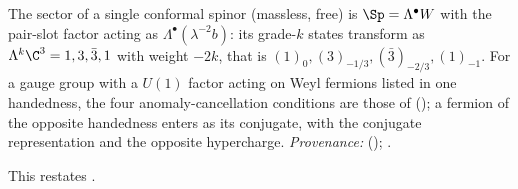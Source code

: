 The sector of a single conformal spinor (massless, free) is $\Sp = \Lambda^{\bullet}W$ with the pair-slot factor acting as $\Lambda^{\bullet}(\lambda^{-2}b)$: its grade-$k$ states transform as $\Lambda^{k}\C^{3} = 1, 3, \bar{3}, 1$ with weight $-2k$, that is $(1)_{0}, (3)_{-1/3}, (\bar{3})_{-2/3}, (1)_{-1}$. For a gauge group with a $U(1)$ factor acting on Weyl fermions listed in one handedness, the four anomaly-cancellation conditions are those of \cite[Fact~2.7]{ButlerT12} (); a fermion of the opposite handedness enters as its conjugate, with the conjugate representation and the opposite hypercharge. \emph{Provenance:} \cite[Prop.~5.3(3), Fact~2.7]{ButlerT12} (); \cite[\S 22.4]{WeinbergQFT2}.

This restates .
